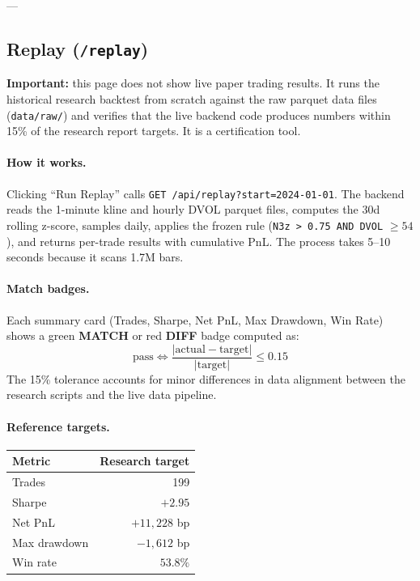 \documentclass[12pt, a4paper]{article}
\begin{document}
---

\subsection{Replay (\texttt{/replay})}

\textbf{Important:} this page does not show live paper trading results.
It runs the historical research backtest from scratch against the raw parquet
data files (\texttt{data/raw/}) and verifies that the live backend code
produces numbers within 15\% of the research report targets. It is a
certification tool.

\paragraph{How it works.}
Clicking ``Run Replay'' calls \texttt{GET /api/replay?start=2024-01-01}.
The backend reads the 1-minute kline and hourly DVOL parquet files, computes
the 30d rolling z-score, samples daily, applies the frozen rule
(\texttt{N3z > 0.75 AND DVOL} $\geq 54$), and returns per-trade results with
cumulative PnL. The process takes 5--10 seconds because it scans 1.7M bars.

\paragraph{Match badges.}
Each summary card (Trades, Sharpe, Net PnL, Max Drawdown, Win Rate) shows a
green \textbf{MATCH} or red \textbf{DIFF} badge computed as:
\[
  \text{pass} \iff \frac{|\text{actual} - \text{target}|}{|\text{target}|} \leq 0.15
\]
The 15\% tolerance accounts for minor differences in data alignment
between the research scripts and the live data pipeline.

\paragraph{Reference targets.}
\begin{center}
\begin{tabular}{lr}
\toprule
Metric & Research target \\
\midrule
Trades       & 199 \\
Sharpe       & $+2.95$ \\
Net PnL      & $+11{,}228$ bp \\
Max drawdown & $-1{,}612$ bp \\
Win rate     & $53.8\%$ \\
\bottomrule
\end{tabular}
\end{center}
\end{document}
